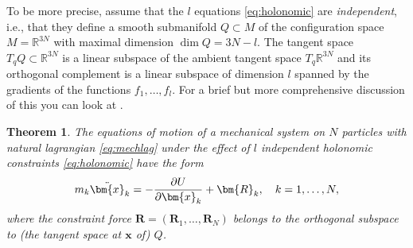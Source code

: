 \documentclass[english,fontsize=11pt,paper=a5,oneside]{scrbook}
\newcommand{\R}{\mathbb{R}}
\newcommand{\bx}{\bm{x}}
\newtheorem{theorem}{Theorem}[chapter]
\theoremstyle{definition}
\begin{document}
To be more precise, assume that the $l$ equations \eqref{eq:holonomic} are \emph{independent}, i.e., that they define a smooth submanifold $Q\subset M$ of the configuration space $M=\R^{3N}$ with maximal dimension $\dim Q = 3N-l$.
The tangent space $T_qQ \subset \R^{3N}$ is a linear subspace of the ambient tangent space $T_q \R^{3N}$ and its orthogonal complement is a linear subspace of dimension $l$ spanned by the gradients of the functions $f_1, \ldots, f_l$.
For a brief but more comprehensive discussion of this you can look at \cite[Chapter 2.8]{lectures:aom:seri}.

\begin{theorem}
  The equations of motion of a mechanical system on $N$ particles with natural lagrangian \eqref{eq:mechlag} under the effect of $l$ independent holonomic constraints \eqref{eq:holonomic} have the form
  \begin{equation}\label{eq:generalnewtonconstraint}
    m_k \ddot \bx_k = - \frac{\partial U}{\partial \bx_k} + \bm{R}_k, \quad k=1, \ldots, N,
  \end{equation}
  where the \emph{constraint force} $\bm{R} = (\bm{R}_1, \ldots, \bm{R}_N)$ belongs to the orthogonal subspace to (the tangent space at $\bx$ of) $Q$.
\end{theorem}
\end{document}
